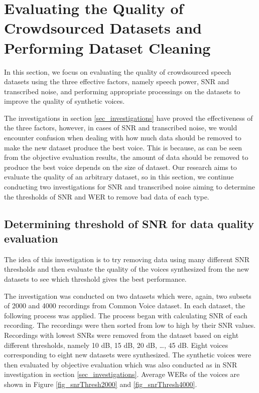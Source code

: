 \documentclass[12pt]{article}
\begin{document}

\clearpage
\section{Evaluating the Quality of Crowdsourced Datasets and Performing Dataset Cleaning}\label{sec_evaluateAndDataCleaning}
In this section, we focus on evaluating the quality of crowdsourced speech datasets using the three effective factors, namely speech power, SNR and transcribed noise, and performing appropriate processings on the datasets to improve the quality of synthetic voices.

The investigations in section \ref{sec_investigations} have proved the effectiveness of the three factors, however, in cases of SNR and transcribed noise, we would encounter confusion when dealing with how much data should be removed to make the new dataset produce the best voice. This is because, as can be seen from the objective evaluation results, the amount of data should be removed to produce the best voice depends on the size of dataset. Our research aims to evaluate the quality of an arbitrary dataset, so in this section, we continue conducting two investigations for SNR and transcribed noise aiming to determine the thresholds of SNR and WER to remove bad data of each type.

\subsection{Determining threshold of SNR for data quality evaluation}
The idea of this investigation is to try removing data using many different SNR thresholds and then evaluate the quality of the voices synthesized from the new datasets to see which threshold gives the best performance.

The investigation was conducted on two datasets which were, again, two subsets of 2000 and 4000 recordings from Common Voice dataset. In each dataset, the following process was applied. The process began with calculating SNR of each recording. The recordings were then sorted from low to high by their SNR values. Recordings with lowest SNRs were removed from the dataset based on eight different thresholds, namely 10 dB, 15 dB, 20 dB, …, 45 dB. Eight voices corresponding to eight new datasets were synthesized. The synthetic voices were then evaluated by objective evaluation which was also conducted as in SNR investigation in section \ref{sec_investigations}. Average WERs of the voices are shown in Figure \ref{fig_snrThresh2000} and \ref{fig_snrThresh4000}.
\end{document}
